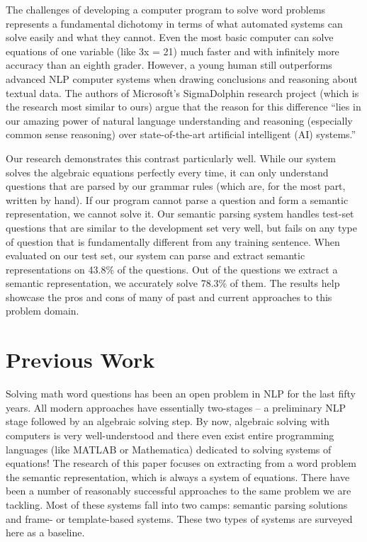 \documentclass[11pt]{article}
\begin{document}
The challenges of developing a computer program to solve word problems represents a fundamental dichotomy in terms of what automated systems can solve easily and what they cannot. Even the most basic computer can solve equations of one variable (like 3x = 21) much faster and with infinitely more accuracy than an eighth grader. However, a young human still outperforms advanced NLP computer systems when drawing conclusions and reasoning about textual data. The authors of Microsoft’s SigmaDolphin research project (which is the research most similar to ours) argue that the reason for this difference ``lies in our amazing power of natural language understanding and reasoning (especially common sense reasoning) over state-of-the-art artificial intelligent (AI) systems.''

Our research demonstrates this contrast particularly well. While our system solves the algebraic equations perfectly every time, it can only understand questions that are parsed by our grammar rules (which are, for the most part, written by hand). If our program cannot parse a question and form a semantic representation, we cannot solve it. Our semantic parsing system handles test-set questions that are similar to the development set very well, but fails on any type of question that is fundamentally different from any training sentence. When evaluated on our test set, our system can parse and extract semantic representations on 43.8\% of the questions. Out of the questions we extract a semantic representation, we accurately solve 78.3\% of them. The results help showcase the pros and cons of many of past and current approaches to this problem domain.

\section{Previous Work}
Solving math word questions has been an open problem in NLP for the last fifty years. All modern approaches have essentially two-stages -- a preliminary NLP stage followed by an algebraic solving step. By now, algebraic solving with computers is very well-understood and there even exist entire programming languages (like MATLAB or Mathematica) dedicated to solving systems of equations! The research of this paper focuses on extracting from a word problem the semantic representation, which is always a system of equations. There have been a number of reasonably successful approaches to the same problem we are tackling. Most of these systems fall into two camps: semantic parsing solutions and frame- or template-based systems. These two types of systems are surveyed here as a baseline.
\end{document}
